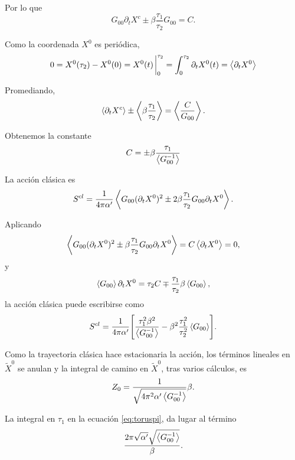 Por lo que 
\begin{equation}
  G_{00}\partial_t X^c \pm \beta \frac{\tau_1}{\tau_2}G_{00}=C.
\end{equation}

Como la coordenada $X^0$ es periódica,
\begin{equation}
  0=X^0(\tau_2) -X^0(0) = X^0(t)\eval_0^{\tau_2}= \int_0^{\tau_2}\partial_t X^0(t) = \ev{\partial_t X^0} 
\end{equation}

Promediando,
\begin{equation}
  \ev{\partial_t X^c} \pm \ev{\beta \frac{\tau_1}{\tau_2}}=\ev{\frac{C}{G_{00}}} .
\end{equation}

Obtenemos la constante
\begin{equation}
  C = \pm \beta \frac{\tau_1}{\ev{G_{00}^{-1}}}
\end{equation}

La acción clásica es
\begin{equation}
  S^{cl}=\frac{1}{4\pi\alpha'}\ev{G_{00}(\partial_t X^0)^2 \pm 2\beta \frac{\tau_1}{\tau_2}G_{00}\partial_t X^0}.
\end{equation}

Aplicando 
\begin{equation}
  \ev{G_{00}(\partial_t X^0)^2 \pm \beta \frac{\tau_1}{\tau_2}G_{00}\partial_t X^0} = C\ev{\partial_t X^0} = 0,
\end{equation}
y
\begin{equation}
  \ev{G_{00}}\partial_t X^0 = \tau_2 C\mp \frac{\tau_1}{\tau_2}\beta \ev{G_{00}},
\end{equation}
la acción clásica puede escribirse como
\begin{equation}
  S^{cl}= \frac{1}{4\pi\alpha'} \qty[\frac{\tau_1^2\beta^2}{\ev{G_{00}^{-1}}}-\beta^2\frac{\tau_1^2}{\tau_2^2}\ev{G_{00}}].
\end{equation}

Como la trayectoria clásica hace estacionaria la acción, los términos lineales en $\tilde X^0$
se anulan y la integral de camino en $\tilde X^0$, tras varios cálculos, es
\begin{equation}
  Z_0=\frac{1}{\sqrt{4\pi^2\alpha'\ev{G_{00}^{-1}}}}\beta.
\end{equation}

La integral en $\tau_1$ en la ecuación \ref{eq:toruspi}, da lugar al término 
\begin{equation}
  \frac{2\pi\sqrt{\alpha'}\sqrt{\ev{G_{00}^{-1}}}}{\beta}.
\end{equation}


